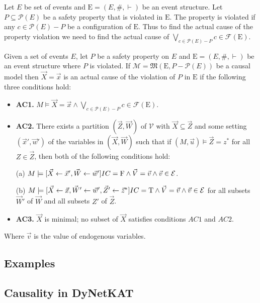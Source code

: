 Let $E$ be set of events and $\mathrm{E} = (E,\#,\vdash)$ be an event structure.
Let $P \subseteq \mathcal{P}(E)$ be a safety property that is violated in 
$\mathrm{E}$.
The property is violated if any $c \in \mathcal{P}(E) - P$ be a configuration
of $\mathrm{E}$. 
Thus to find the actual cause of the property violation we need to find 
the actual cause of 
$\bigvee_{c \in \mathcal{P}(E) - P}c \in \mathcal{F}(\mathrm{E})$.
\begin{definition}
    Given a set of events $E$, let $P$ be a safety property on $E$ and 
    $\mathrm{E} = (E,\#,\vdash)$ be an event structure where $P$ is violated.
    If $\mathcal{M} = \mathfrak{M}(\mathrm{E}, P - \mathcal{P}(E))$
    be a causal model then $\vec X = \vec x$ is
    an actual cause of the violation of $P$ in $\mathrm{E}$ if the
    following three conditions hold:
    \begin{itemize}
        \item  \textbf{AC1.} $M\models \vec X = \vec x
                  \wedge \bigvee_{c \in \mathcal{P}(E) - P}c \in \mathcal{F}(\mathrm{E})$.
        \item  \textbf{AC2. }There exists a partition $(\vec Z, \vec W)$ of $\mathcal{V}$ with $\vec X \subseteq \vec Z$ and some setting $(\vec x',\vec w')$ of the variables in $(\vec X,\vec W)$ such that if $(M,\vec u)\models \vec Z = z^*$ for all $Z\in \vec Z$, then both of the following conditions hold:

              (a) $M \models[\vec X \leftarrow \vec x', \vec W \leftarrow \vec w']
                  IC = \mathrm{F}
                  \wedge \vec V = \vec v
                  \wedge  \vec v \in \mathcal{E}$.

              (b) $M \models[\vec X\leftarrow \vec x, \vec W' \leftarrow \vec w', \vec Z'\leftarrow \vec z^*]
                  IC = \mathrm{T}
                  \wedge \vec V = \vec v
                  \wedge \vec v \in \mathcal{E}$
              for all subsets $\vec W'$ of $\vec W$ and all subsets $Z'$ of $\vec Z$.

        \item  \textbf{AC3.} $\vec X$ is minimal; no subset of $\vec X$ satisfies conditions $AC1$ and $AC2$.
    \end{itemize}
    Where $\vec v$ is the value of endogenous variables.
\end{definition}
\pagebreak


\subsection{Examples}


\subsection{Causality in DyNetKAT}
